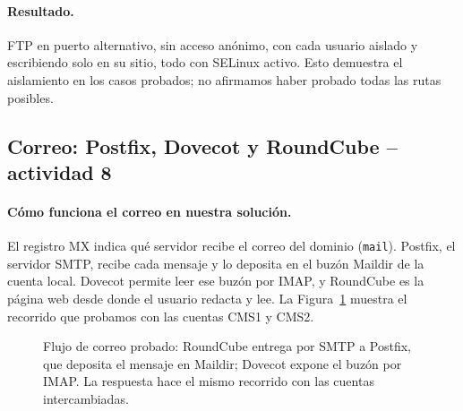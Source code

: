 \documentclass[11pt,a4paper]{article}
\begin{document}
\paragraph{Resultado.} FTP en puerto alternativo, sin acceso anónimo, con cada usuario aislado y escribiendo solo en su sitio, todo con SELinux activo. Esto demuestra el aislamiento en los casos probados; no afirmamos haber probado todas las rutas posibles.

\subsection{Correo: Postfix, Dovecot y RoundCube -- actividad 8}
\paragraph{Cómo funciona el correo en nuestra solución.} El registro MX indica qué servidor recibe el correo del dominio (\texttt{mail}). Postfix, el servidor SMTP, recibe cada mensaje y lo deposita en el buzón Maildir de la cuenta local. Dovecot permite leer ese buzón por IMAP, y RoundCube es la página web desde donde el usuario redacta y lee. La Figura~\ref{fig:flujo-correo} muestra el recorrido que probamos con las cuentas CMS1 y CMS2.
\begin{figure}[htbp]\centering
{}
\caption[Flujo de entrega y lectura de correo]{Flujo de correo probado: RoundCube entrega por SMTP a Postfix, que deposita el mensaje en Maildir; Dovecot expone el buzón por IMAP. La respuesta hace el mismo recorrido con las cuentas intercambiadas.}\label{fig:flujo-correo}
\end{figure}
\end{document}

